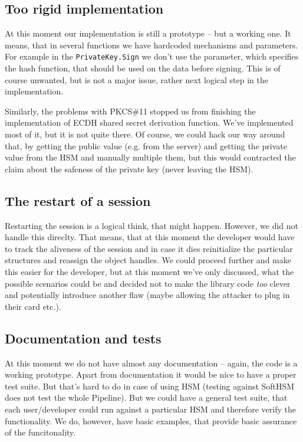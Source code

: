 \documentclass[a4paper]{scrartcl}
\begin{document}
\subsection{Too rigid implementation}
At this moment our implementation is still a prototype -- but a working one. It means, that in several functions we have hardcoded mechanisms and parameters. For example in the \lstinline[columns=fixed]{PrivateKey.Sign} we don't use the parameter, which specifies the hash function, that should be used on the data before signing. This is of course unwanted, but is not a major issue, rather next logical step in the implementation.

Similarly, the problems with PKCS\#11 stopped us from finishing the implementation of ECDH shared secret derivation function. We've implemented most of it, but it is not quite there. Of course, we could hack our way around that, by getting the public value (e.g. from the server) and getting the private value from the HSM and manually multiple them, but this would contracted the claim about the safeness of the private key (never leaving the HSM).

\subsection{The restart of a session}
Restarting the session is a logical think, that might happen. However, we did not handle this direclty. That means, that at this moment the developer would have to track the aliveness of the session and in case it dies reinitialize the particular structures and reassign the object handles. We could proceed further and make this easier for the developer, but at this moment we've only discussed, what the possible scenarios could be and decided not to make the library code \textit{too} clever and potentially introduce another flaw (maybe allowing the attacker to plug in their card etc.).

\subsection{Documentation and tests}
At this moment we do not have almost any documentation -- again, the code is a working prototype. Apart from documentation it would be nice to have a proper test suite. But that's hard to do in case of using HSM (testing against SoftHSM does not test the whole Pipeline). But we could have a general test suite, that each user/developer could run against a particular HSM and therefore verify the functionality. We do, however, have basic examples, that provide basic assurance of the funcitonality.
\end{document}
